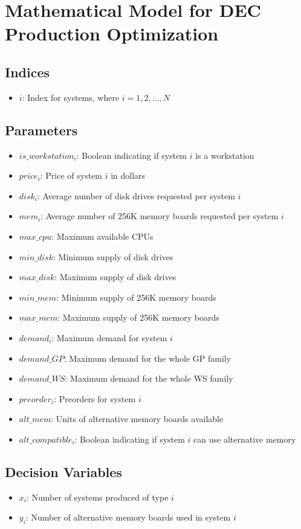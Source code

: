 \documentclass{article}
\begin{document}
\section*{Mathematical Model for DEC Production Optimization}

\subsection*{Indices}
\begin{itemize}
    \item $i$: Index for systems, where $i = 1, 2, \ldots, N$
\end{itemize}

\subsection*{Parameters}
\begin{itemize}
    \item $is\_workstation_i$: Boolean indicating if system $i$ is a workstation
    \item $price_i$: Price of system $i$ in dollars
    \item $disk_i$: Average number of disk drives requested per system $i$
    \item $mem_i$: Average number of 256K memory boards requested per system $i$
    \item $max\_cpu$: Maximum available CPUs
    \item $min\_disk$: Minimum supply of disk drives
    \item $max\_disk$: Maximum supply of disk drives
    \item $min\_mem$: Minimum supply of 256K memory boards
    \item $max\_mem$: Maximum supply of 256K memory boards
    \item $demand_i$: Maximum demand for system $i$
    \item $demand\_GP$: Maximum demand for the whole GP family
    \item $demand\_WS$: Maximum demand for the whole WS family
    \item $preorder_i$: Preorders for system $i$
    \item $alt\_mem$: Units of alternative memory boards available
    \item $alt\_compatible_i$: Boolean indicating if system $i$ can use alternative memory
\end{itemize}

\subsection*{Decision Variables}
\begin{itemize}
    \item $x_i$: Number of systems produced of type $i$
    \item $y_i$: Number of alternative memory boards used in system $i$
\end{itemize}
\end{document}

